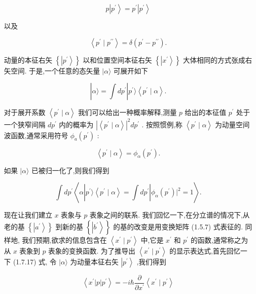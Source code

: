 \documentclass[lang=cn,newtx,10pt,scheme=chinese,thmcnt=section]{elegantbook}
\begin{document}
$$
p\left| {p}^{\prime }\right\rangle = {p}^{\prime }\left| {p}^{\prime }\right\rangle \tag{1.7.22}
$$

以及

$$
\left\langle {{p}^{\prime } \mid {p}^{\prime \prime }}\right\rangle = \delta \left( {{p}^{\prime } - {p}^{\prime \prime }}\right) . \tag{1. 7.23}
$$

动量的本征右矢 $\left\{ \left| {p}^{\prime }\right\rangle \right\}$ 以和位置空间本征右矢 $\left\{ \left| {x}^{\prime }\right\rangle \right\}$ 大体相同的方式张成右矢空间. 于是,一个任意的态矢量 $|\alpha \rangle$ 可展开如下

$$
\left| {\alpha \rangle = \int d{p}^{\prime }}\right| {p}^{\prime }\rangle \left\langle {{p}^{\prime } \mid \alpha }\right\rangle . \tag{1. 7.24}
$$

对于展开系数 $\left\langle {{p}^{\prime } \mid \alpha }\right\rangle$ 我们可以给出一种概率解释,测量 $p$ 给出的本征值 ${p}^{\prime }$ 处于一个狭窄间隔 $d{p}^{\prime }$ 内的概率为 ${\left| \left\langle {p}^{\prime } \mid \alpha \right\rangle \right| }^{2}d{p}^{\prime }$ . 按照惯例,称 $\left\langle {{p}^{\prime } \mid \alpha }\right\rangle$ 为动量空间波函数,通常采用符号 ${\phi }_{a}\left( {p}^{\prime }\right)$ :

$$
\left\langle {{p}^{\prime } \mid \alpha }\right\rangle = {\phi }_{\alpha }\left( {p}^{\prime }\right) . \tag{1.7.25}
$$

如果 $|\alpha \rangle$ 已被归一化了,则我们得到

$$
\int d{p}^{\prime }\left\langle {\alpha \left| {{p}^{\prime }\rangle \left\langle {{p}^{\prime } \mid \alpha }\right\rangle = \int d{p}^{\prime }}\right| {\phi }_{\alpha }\left( {p}^{\prime }\right) {\left. \right| }^{2} = 1}\right\rangle . \tag{1.7.26}
$$

现在让我们建立 $x$ 表象与 $p$ 表象之间的联系. 我们回忆一下,在分立谱的情况下,从老的基 $\left\{ \left| {a}^{\prime }\right\rangle \right\}$ 到新的基 $\left\{ \left| {b}^{\prime }\right\rangle \right\}$ 的基的改变是用变换矩阵 (1.5.7) 式表征的. 同样地, 我们预期,欲求的信息包含在 $\left\langle {{x}^{\prime } \mid {p}^{\prime }}\right\rangle$ 中,它是 ${x}^{\prime }$ 和 ${p}^{\prime }$ 的函数,通常称之为从 $x$ 表象到 $p$ 表象的变换函数. 为了推导出 $\left\langle {{x}^{\prime } \mid {p}^{\prime }}\right\rangle$ 的显示表达式,首先回忆一下 (1.7.17) 式, 令 $|\alpha \rangle$ 为动量本征右矢 $\left| {p}^{\prime }\right\rangle$ ,我们得到

$$
\left\langle {{x}^{\prime }\left| p\right| {p}^{\prime }}\right\rangle = - i\hbar \frac{\partial }{\partial {x}^{\prime }}\left\langle {{x}^{\prime } \mid {p}^{\prime }}\right\rangle \tag{1.7.27}
$$
\end{document}
